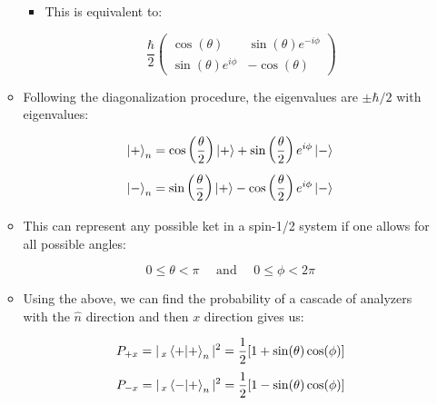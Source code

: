 \begin{itemize}
\begin{itemize}
\begin{itemize}
          \item This is equivalent to:

            $$\frac{\hbar}{2}\left( \begin{matrix} \cos(\theta) & \sin(\theta)e^{-i\phi}\\ \sin(\theta)e^{i\phi} & -\cos(\theta)\end{matrix}\right)$$

        \end{itemize}

      \item Following the diagonalization procedure, the eigenvalues are $\pm\hbar/2$ with eigenvalues:

        $$\ket{+}_n=\cos\left( \frac{\theta}{2} \right)\ket{+}+\sin\left( \frac{\theta}{2} \right)e^{i\phi}\ket{-}$$
        $$\ket{-}_n=\sin\left( \frac{\theta}{2} \right)\ket{+}-\cos\left( \frac{\theta}{2} \right)e^{i\phi}\ket{-}$$

      \item This can represent any possible ket in a spin-1/2 system if one allows for all possible angles:

        $$0\leq\theta <\pi\quad\text{ and }\quad0\leq\phi< 2\pi$$

      \item Using the above, we can find the probability of a cascade of analyzers with the $\hat{n}$ direction and then $x$ direction gives us:

        $$P_{+x}=|\,_x\braket{+}_n|^2=\frac{1}{2}[1+\sin(\theta)\cos(\phi)]$$
        $$P_{-x}=|\,_x\bra{-}\ket{+}_n|^2=\frac{1}{2}[1-\sin(\theta)\cos(\phi)]$$

    \end{itemize}

\end{itemize}



